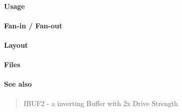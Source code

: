 \paragraph{Usage}

\paragraph{Fan-in / Fan-out}

\paragraph{Layout}

\paragraph{Files}

\paragraph{See also}
\begin{quote}
    IBUF2 - a inverting Buffer with 2x Drive Strength
\end{quote}
